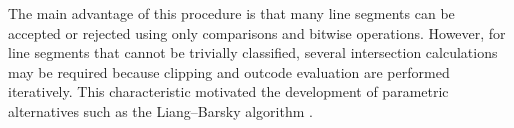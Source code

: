 The main advantage of this procedure is that many line segments can be accepted or rejected using only comparisons and bitwise operations. However, for line segments that cannot be trivially classified, several intersection calculations may be required because clipping and outcode evaluation are performed iteratively. This characteristic motivated the development of parametric alternatives such as the Liang--Barsky algorithm \cite{MatthesDrakopoulos2022,LiangBarsky1984}.


